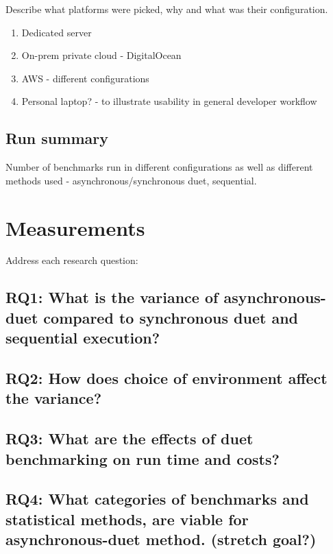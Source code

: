Describe what platforms were picked, why and what was their configuration.
\begin{enumerate}
  \item Dedicated server
  \item On-prem private cloud - DigitalOcean
  \item AWS - different configurations
  \item Personal laptop? - to illustrate usability in general developer workflow
\end{enumerate}

\subsection{Run summary}

Number of benchmarks run in different configurations as well as different methods used - asynchronous/synchronous duet, sequential.


\section{Measurements}

Address each research question:

\subsection{RQ1: What is the variance of asynchronous-duet compared to synchronous duet and sequential execution?}

\subsection{RQ2: How does choice of environment affect the variance?}

\subsection{RQ3: What are the effects of duet benchmarking on run time and costs?}

\subsection{RQ4: What categories of benchmarks and statistical methods, are viable for asynchronous-duet method. (stretch goal?)}
